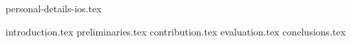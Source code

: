 
%



	{personal-details-ios.tex}

	\begin{abstract}
		{abstract.tex}
	\end{abstract}

	{introduction.tex}
	{preliminaries.tex}
	{contribution.tex}
	{evaluation.tex}
	{conclusions.tex}

	
	
